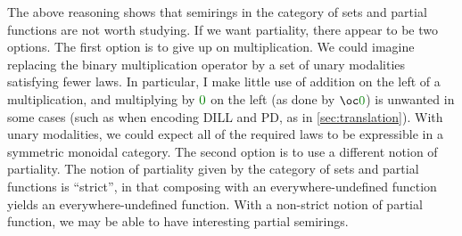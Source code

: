 The above reasoning shows that semirings in the category of sets and partial
functions are not worth studying.
If we want partiality, there appear to be two options.
The first option is to give up on multiplication.
We could imagine replacing the binary multiplication operator by a set of
unary modalities satisfying fewer laws.
In particular, I make little use of addition on the left of a multiplication,
and multiplying by $\gr0$ on the left (as done by $\oc\gr0$) is unwanted in some
cases (such as when encoding DILL and PD, as in \cref{sec:translation}).
With unary modalities, we could expect all of the required laws to be
expressible in a symmetric monoidal category.
The second option is to use a different notion of partiality.
The notion of partiality given by the category of sets and partial functions is
``strict'', in that composing with an everywhere-undefined function yields an
everywhere-undefined function.
With a non-strict notion of partial function, we may be able to have interesting
partial semirings.
